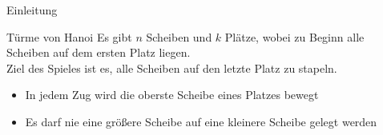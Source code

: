 \begin{frame}{Einleitung}
    \begin{block}{Türme von Hanoi}
    Es gibt $n$ Scheiben und $k$ Plätze, wobei zu Beginn alle Scheiben auf dem ersten Platz liegen.\\
    Ziel des Spieles ist es, alle Scheiben auf den letzte Platz zu stapeln.
    \begin{itemize}
        \item In jedem Zug wird die oberste Scheibe eines Platzes bewegt
        \item Es darf nie eine größere Scheibe auf eine kleinere Scheibe gelegt werden
    \end{itemize}
    \end{block}
\end{frame}